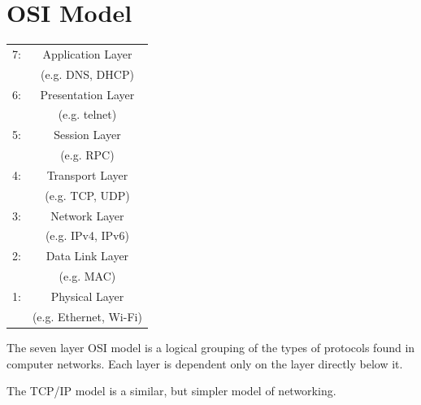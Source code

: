 \appendix 
\chapter{OSI Model}
\label{osi}
  \begin{center}
  \begin{tabular}{|lc|}
  \hline
  7: &
  Application Layer \\
  & (e.g. DNS, DHCP) \\
  \hline
  6: &
  Presentation Layer \\
  & (e.g. telnet) \\ 
  \hline
  5: &
  Session Layer \\
  & (e.g. RPC) \\
  \hline
  4: &
  Transport Layer \\
  & (e.g. TCP, UDP) \\
  \hline
  3: &
  Network Layer \\
  & (e.g. IPv4, IPv6) \\
  \hline  
  2: &
  Data Link Layer \\
  & (e.g. MAC) \\ 
  \hline  
  1: &
  Physical Layer \\
  & (e.g. Ethernet, Wi-Fi) \\
  \hline
\end{tabular}
\end{center}

The seven layer OSI model is a logical grouping of the types of protocols found
in computer networks. Each layer is dependent only on the layer directly below
it. 

The TCP/IP model is a similar, but simpler model of networking.

